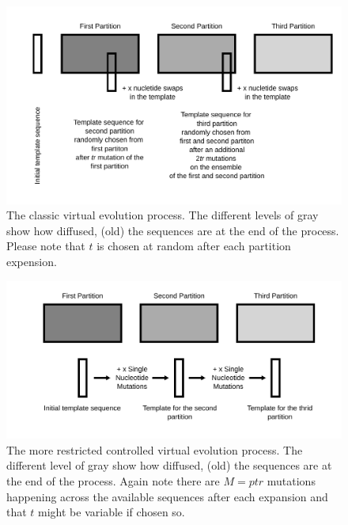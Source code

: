 \begin{figure}
  \begin{center}
  \includegraphics[scale=0.9]{virtual-evolution.pdf}
  \caption{The classic virtual evolution process. The different levels of gray
    show how diffused, (old) the sequences are at the end of the
    process. Please note that $t$ is chosen at random after each
    partition expension.}
  \label{fig-virtual-evolution}
  \end{center}
\end{figure}
\begin{figure}
  \begin{center}
  \includegraphics[scale=0.9]{virtual-evolution-controlled.pdf}
  \caption{The more restricted controlled virtual evolution
    process. The different level of gray show how diffused, (old) the
    sequences are at the end of the process. Again note there are
    $M = ptr$ mutations happening across the available sequences after
    each expansion and that $t$ might be variable if chosen so.}
  \label{fig-virtual-evolution-controlled}
  \end{center}
\end{figure}


